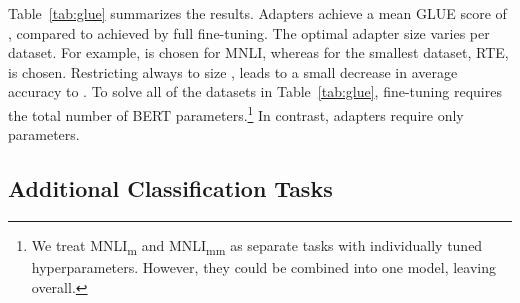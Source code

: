 \documentclass{article}
\begin{document}
Table~\ref{tab:glue} summarizes the results.
Adapters achieve a mean GLUE score of , compared to  achieved by full fine-tuning.
The optimal adapter size varies per dataset. For example,  is chosen for MNLI, whereas for the smallest dataset, RTE,  is chosen.
Restricting always to size , leads to a small decrease in average accuracy to .
To solve all of the datasets in Table~\ref{tab:glue}, fine-tuning requires  the total number of BERT parameters.\footnote{
We treat MNLI\textsubscript{m} and MNLI\textsubscript{mm} as separate tasks with individually tuned hyperparameters.
However, they could be combined into one model, leaving  overall.}
In contrast, adapters require only  parameters.

\subsection{Additional Classification Tasks}
\end{document}
